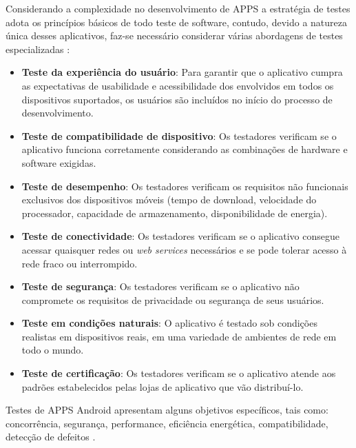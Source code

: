 
Considerando a complexidade no desenvolvimento de \ac{APPS} a estratégia de testes adota os princípios básicos de todo teste de software, contudo, devido a natureza única desses aplicativos, faz-se necessário considerar várias abordagens de testes especializadas \cite{PRESSMAN2016}:


\begin{itemize}

    \item \textbf{Teste da experiência do usuário}: Para garantir que o aplicativo cumpra as expectativas de usabilidade e acessibilidade dos envolvidos em todos os dispositivos suportados, os usuários são incluídos no início do processo de desenvolvimento.
    
    \item \textbf{Teste de compatibilidade de dispositivo}: Os testadores verificam se o aplicativo funciona corretamente considerando as combinações de hardware e software exigidas.
    
    \item \textbf{Teste de desempenho}: Os testadores verificam os requisitos não funcionais exclusivos dos dispositivos móveis (tempo de download, velocidade do processador, capacidade de armazenamento, disponibilidade de energia).
    
    \item \textbf{Teste de conectividade}: Os testadores verificam se o aplicativo consegue acessar quaisquer redes ou \textit{web services} necessários e se pode tolerar acesso à rede fraco ou interrompido.
    
    \item \textbf{Teste de segurança}: Os testadores verificam se o aplicativo não compromete os requisitos de privacidade ou segurança de seus usuários.
    
    \item \textbf{Teste em condições naturais}: O aplicativo é testado sob condições realistas em dispositivos reais, em uma variedade de ambientes de rede em todo o mundo.
    
    \item \textbf{Teste de certificação}: Os testadores verificam se o aplicativo atende aos padrões estabelecidos pelas lojas de aplicativo que vão distribuí-lo.

\end{itemize}

Testes de \ac{APPS} Android apresentam alguns objetivos específicos, tais como: concorrência, segurança, performance, eficiência energética, compatibilidade, detecção de defeitos \cite{8453877}.


